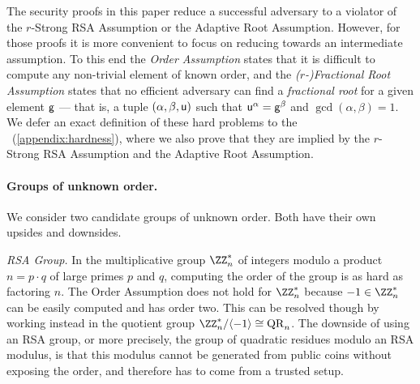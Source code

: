 \ifappendix
The security proofs in this paper reduce a successful adversary to a violator of the $r$-Strong RSA Assumption or the Adaptive Root Assumption. However, for those proofs it is more convenient to focus on reducing towards an intermediate assumption. To this end the \emph{Order Assumption} states that it is difficult to compute any non-trivial element of known order, and the \emph{($r$-)Fractional Root Assumption} states that no efficient adversary can find a \emph{fractional root} for a given element $\mathsf{g}$ --- that is, a tuple $(\alpha, \beta, \mathsf{u})$ such that $\mathsf{u}^\alpha = \mathsf{g}^\beta$ and $\gcd(\alpha, \beta) = 1$. We defer an exact definition of these hard problems to the \appendixphrase~(\ref{appendix:hardness}), where we also prove that they are implied by the $r$-Strong RSA Assumption and the Adaptive Root Assumption.
\else 

\fi

\paragraph{Groups of unknown order.}
We consider two candidate groups of unknown order. Both have their own upsides and downsides.

\textit{RSA Group.} In the multiplicative group $\ZZ_n^*$ of integers modulo a product $n=p\cdot q$ of large primes $p$ and $q$, computing the order of the group is as hard as factoring $n$. The Order Assumption does not hold for $\ZZ_n^*$ because $-1 \in \ZZ_n^*$ can be easily computed and has order two. This can be resolved though by working instead in the quotient group $\ZZ_n^* / \langle-1\rangle \cong \mathrm{QR}_n$. %
The downside of using an RSA group, or more precisely, the group of quadratic residues modulo an RSA modulus, is that this modulus cannot be generated from public coins without exposing the order, and therefore has to come from a trusted setup.


